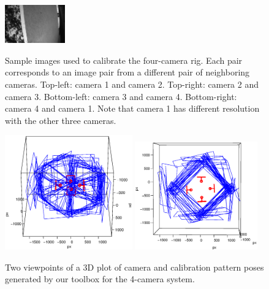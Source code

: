 \documentclass{report}
\begin{document}
\begin{figure}
\includegraphics[width=0.23\textwidth]{images/cam4rig/8} \\%
\caption{Sample images used to calibrate the four-camera rig. Each pair corresponds to an image pair from a different pair of neighboring cameras. Top-left: camera 1 and camera 2. Top-right: camera 2 and camera 3. Bottom-left: camera 3 and camera 4. Bottom-right: camera 4 and camera 1. Note that camera 1 has different resolution with the other three cameras. }
\label{fourCameraRigImageFig}
\end{figure}

\begin{figure}
\centering 
\includegraphics[trim=0in 0in 0in 0.4in, clip=true, width=0.49\textwidth]{images/rig2} 
\includegraphics[width=0.47\textwidth]{images/rig1} 
\caption{Two viewpoints of a 3D plot of camera and calibration pattern poses generated by our toolbox for the 4-camera system. } 
\label{fourCameraRigPlot}
\end{figure}
\end{document}
